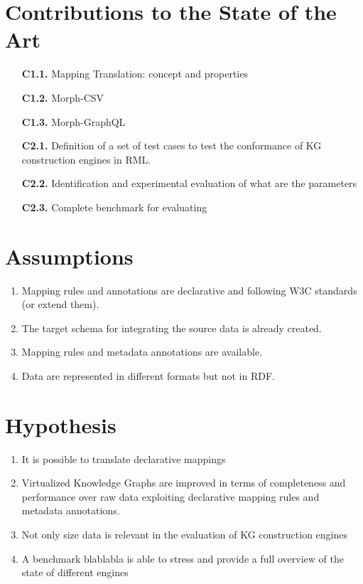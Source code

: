\section{Contributions to the State of the Art}


\begin{enumerate}
    \item[\textbf{C1.1.}] Mapping Translation: concept and properties
    \item[\textbf{C1.2.}] Morph-CSV 
    \item[\textbf{C1.3.}] Morph-GraphQL
    \item[\textbf{C2.1.}] Definition of a set of test cases to test the conformance of KG construction engines in RML.
    \item[\textbf{C2.2.}] Identification and experimental evaluation of what are the parameters
    \item[\textbf{C2.3.}] Complete benchmark for evaluating
\end{enumerate}

\section{Assumptions}

\begin{enumerate}[label=\textbf{A{\arabic*}}]
    \item Mapping rules and annotations are declarative and following W3C standards (or extend them). 
    \item The target schema for integrating the source data is already created.
    \item Mapping rules and metadata annotations are available.
    \item Data are represented in different formats but not in RDF.
\end{enumerate}

\section{Hypothesis}

\begin{enumerate}[label=\textbf{H{\arabic*}}]
    \item It is possible to translate declarative mappings
    \item Virtualized Knowledge Graphs are improved in terms of completeness and performance over raw data exploiting declarative mapping rules and metadata annotations.
    \item Not only size data is relevant in the evaluation of KG construction engines
    \item A benchmark blablabla is able to stress and provide a full overview of the state of different engines 
\end{enumerate}

